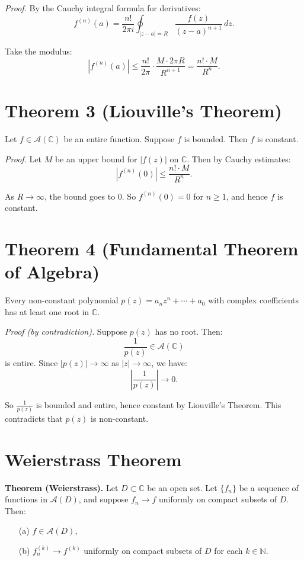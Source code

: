 \documentclass[12pt]{article}
\theoremstyle{definition} %
\theoremstyle{plain} %
\begin{document}
\textit{Proof.} By the Cauchy integral formula for derivatives:
\[
f^{(n)}(a) = \frac{n!}{2\pi i} \oint_{|z - a| = R} \frac{f(z)}{(z - a)^{n+1}}\,dz.
\]

Take the modulus:
\[
|f^{(n)}(a)| \leq \frac{n!}{2\pi} \cdot \frac{M \cdot 2\pi R}{R^{n+1}} = \frac{n! \cdot M}{R^n}.
\]

\section*{Theorem 3 (Liouville’s Theorem)}

Let $f \in \mathcal{A}(\mathbb{C})$ be an entire function. Suppose $f$ is bounded. Then $f$ is constant.

\textit{Proof.} Let $M$ be an upper bound for $|f(z)|$ on $\mathbb{C}$. Then by Cauchy estimates:
\[
|f^{(n)}(0)| \leq \frac{n! \cdot M}{R^n}.
\]

As $R \to \infty$, the bound goes to 0. So $f^{(n)}(0) = 0$ for $n \geq 1$, and hence $f$ is constant.

\section*{Theorem 4 (Fundamental Theorem of Algebra)}

Every non-constant polynomial $p(z) = a_n z^n + \cdots + a_0$ with complex coefficients has at least one root in $\mathbb{C}$.

\textit{Proof (by contradiction).} Suppose $p(z)$ has no root. Then:
\[
\frac{1}{p(z)} \in \mathcal{A}(\mathbb{C})
\]
is entire. Since $|p(z)| \to \infty$ as $|z| \to \infty$, we have:
\[
\left| \frac{1}{p(z)} \right| \to 0.
\]

So $\frac{1}{p(z)}$ is bounded and entire, hence constant by Liouville’s Theorem. This contradicts that $p(z)$ is non-constant.

\section*{Weierstrass Theorem}

\textbf{Theorem (Weierstrass).} Let $D \subset \mathbb{C}$ be an open set. Let $\{f_n\}$ be a sequence of functions in $\mathcal{A}(D)$, and suppose $f_n \to f$ uniformly on compact subsets of $D$. Then:
\begin{enumerate}
    \item[(a)] $f \in \mathcal{A}(D)$,
    \item[(b)] $f_n^{(k)} \to f^{(k)}$ uniformly on compact subsets of $D$ for each $k \in \mathbb{N}$.
\end{enumerate}
\end{document}
